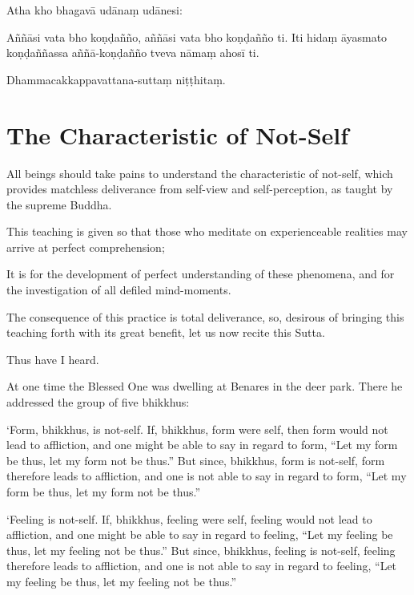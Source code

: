 Atha kho bhagavā udānaṃ udānesi:

Aññāsi vata bho koṇḍañño, aññāsi vata bho koṇḍañño ti. Iti hidaṃ āyasmato
koṇḍaññassa aññā-koṇḍañño tveva nāmaṃ ahosī ti.

Dhammacakkappavattana-suttaṃ niṭṭhitaṃ.

\chapterTocDelegatePageNumber
\chapter{The Characteristic of Not-Self}%

\setTocDelegatedPageNumber
\englishText
\renewcommand{\englishTitle}{The Characteristic of Not-Self}

\begin{leader}

All beings should take pains to understand the characteristic of
not-self, which provides matchless deliverance from self-view and
self-perception, as taught by the supreme Buddha.

This teaching is given so that those who meditate on experienceable
realities may arrive at perfect comprehension;

It is for the development of perfect understanding of these phenomena,
and for the investigation of all defiled mind-moments.

The consequence of this practice is total deliverance, so, desirous of
bringing this teaching forth with its great benefit, let us now recite
this Sutta.

\end{leader}

Thus have I heard.

At one time the Blessed One was dwelling at Benares in the deer park.
There he addressed the group of five bhikkhus:

‘Form, bhikkhus, is not-self. If, bhikkhus, form were self, then form
would not lead to affliction, and one might be able to say in regard to
form, “Let my form be thus, let my form not be thus.” But since,
bhikkhus, form is not-self, form therefore leads to affliction, and one
is not able to say in regard to form, “Let my form be thus, let my form
not be thus.”

‘Feeling is not-self. If, bhikkhus, feeling were self, feeling would
not lead to affliction, and one might be able to say in regard to
feeling, “Let my feeling be thus, let my feeling not be thus.” But
since, bhikkhus, feeling is not-self, feeling therefore leads to
affliction, and one is not able to say in regard to feeling, “Let my
feeling be thus, let my feeling not be thus.”

